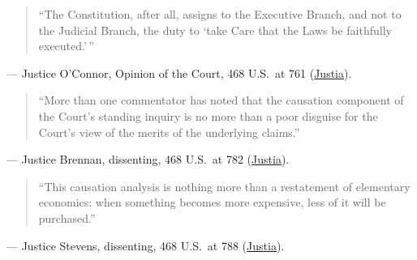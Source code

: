\documentclass[12pt]{article}
\begin{document}
\begin{quote}
``The Constitution, after all, assigns to the Executive Branch, and not to the Judicial Branch, the duty to `take Care that the Laws be faithfully executed.'\,''
\end{quote}
\noindent --- Justice O'Connor, Opinion of the Court, 468 U.S.\ at 761 (\href{https://supreme.justia.com/cases/federal/us/468/737/}{Justia}).

\begin{quote}
``More than one commentator has noted that the causation component of the Court's standing inquiry is no more than a poor disguise for the Court's view of the merits of the underlying claims.''
\end{quote}
\noindent --- Justice Brennan, dissenting, 468 U.S.\ at 782 (\href{https://supreme.justia.com/cases/federal/us/468/737/}{Justia}).

\begin{quote}
``This causation analysis is nothing more than a restatement of elementary economics: when something becomes more expensive, less of it will be purchased.''
\end{quote}
\noindent --- Justice Stevens, dissenting, 468 U.S.\ at 788 (\href{https://supreme.justia.com/cases/federal/us/468/737/}{Justia}).
\end{document}
